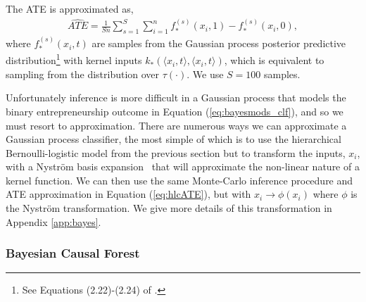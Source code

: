 \documentclass[12pt, a4paper]{article}
\begin{document}
The ATE is approximated as,
\begin{align*}
  \hat{ATE} = \frac{1}{Sn} \sum^S_{s=1}\sum^n_{i=1}
    f^{(s)}_*(x_i, 1) - f^{(s)}_*(x_i, 0),
\end{align*}
where $f^{(s)}_*(x_i, t)$ are samples from the Gaussian process posterior
predictive distribution\footnote{See Equations (2.22)-(2.24)
of \citet{williams2006}.} with kernel inputs $k_*(\langle x_i, t \rangle, \langle x_i, t
\rangle)$, which is equivalent to sampling from the distribution over
$\tau(\cdot)$. We use $S=100$ samples.

Unfortunately inference is more difficult in a Gaussian process that models the
binary entrepreneurship outcome in Equation (\ref{eq:bayesmods_clf}), and so we
must resort to approximation. There are numerous ways we can approximate a
Gaussian process classifier, the most simple of which is to use the
hierarchical Bernoulli-logistic model from the previous section but to
transform the inputs, $x_i$, with a Nystr\"om basis
expansion~\citep{williams2000} that will approximate the non-linear nature of a
kernel function. We can then use the same Monte-Carlo inference procedure and
ATE approximation in Equation (\ref{eq:hlcATE}), but with $x_i \to \phi(x_i)$
where $\phi$ is the Nystr\"om transformation. We give more details of this
transformation in Appendix \ref{app:bayes}.

\subsubsection*{Bayesian Causal Forest}
\label{sub:bcf}
\end{document}
